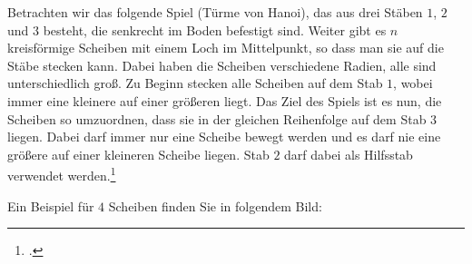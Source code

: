 \documentclass{bschlangaul-aufgabe}
\begin{document}

Betrachten wir das folgende Spiel (Türme von Hanoi), das aus drei Stäben
$1$, $2$ und $3$ besteht, die senkrecht im Boden befestigt sind. Weiter
gibt es $n$ kreisförmige Scheiben mit einem Loch im Mittelpunkt, so dass
man sie auf die Stäbe stecken kann. Dabei haben die Scheiben
verschiedene Radien, alle sind unterschiedlich groß. Zu Beginn stecken
alle Scheiben auf dem Stab $1$, wobei immer eine kleinere auf einer
größeren liegt. Das Ziel des Spiels ist es nun, die Scheiben so
umzuordnen, dass sie in der gleichen Reihenfolge auf dem Stab $3$
liegen. Dabei darf immer nur eine Scheibe bewegt werden und es darf nie
eine größere auf einer kleineren Scheibe liegen. Stab $2$ darf dabei als
Hilfsstab verwendet werden.\footcite[Aufgabe 2]{aud:ab:7}

Ein Beispiel für $4$ Scheiben finden Sie in folgendem Bild:

\begin{center}
\end{center}

\begin{center}
\end{center}
\end{document}
